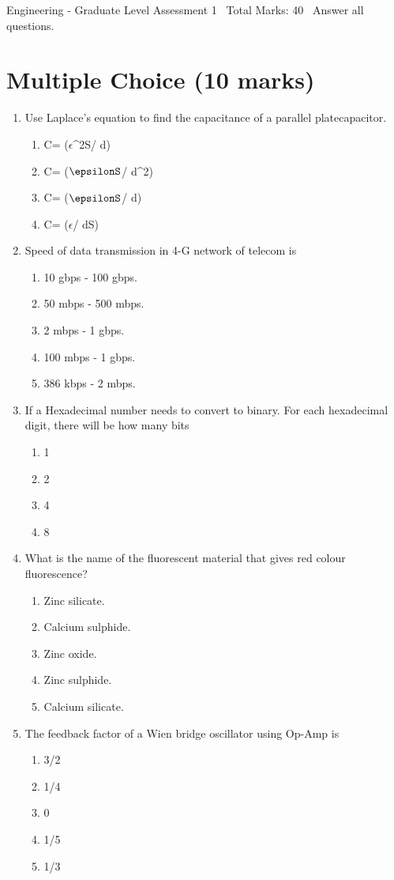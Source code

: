 \documentclass[12pt]{article}
\begin{document}
\begin{center}
Engineering - Graduate Level Assessment 1 \
Total Marks: 40 \
Answer all questions.
\end{center}

\section*{Multiple Choice (10 marks)}
\begin{enumerate}[label=\arabic*.]
\item Use Laplace's equation to find the capacitance of a parallel platecapacitor.
\begin{enumerate}[label=(\alph*)]
    \item C= (\ensuremath{\epsilon}\^{}2S/ d)
    \item C= (\ensuremath{\epsilonS}/ d\^{}2)
    \item C= (\ensuremath{\epsilonS}/ d)
    \item C= (\ensuremath{\epsilon}/ dS)
\end{enumerate}
\item Speed of data transmission in 4-G network of telecom is
\begin{enumerate}[label=(\alph*)]
    \item 10 gbps - 100 gbps.
    \item 50 mbps - 500 mbps.
    \item 2 mbps - 1 gbps.
    \item 100 mbps - 1 gbps.
    \item 386 kbps - 2 mbps.
\end{enumerate}
\item If a Hexadecimal number needs to convert to binary. For each hexadecimal digit, there will
be how many bits
\begin{enumerate}[label=(\alph*)]
    \item 1
    \item 2
    \item 4
    \item 8
\end{enumerate}
\item What is the name of the fluorescent material that gives red colour fluorescence?
\begin{enumerate}[label=(\alph*)]
    \item Zinc silicate.
    \item Calcium sulphide.
    \item Zinc oxide.
    \item Zinc sulphide.
    \item Calcium silicate.
\end{enumerate}
\item The feedback factor of a Wien bridge oscillator using Op-Amp is
\begin{enumerate}[label=(\alph*)]
    \item 3/2
    \item 1/4
    \item 0
    \item 1/5
    \item 1/3
\end{enumerate}
\end{enumerate}
\end{document}
